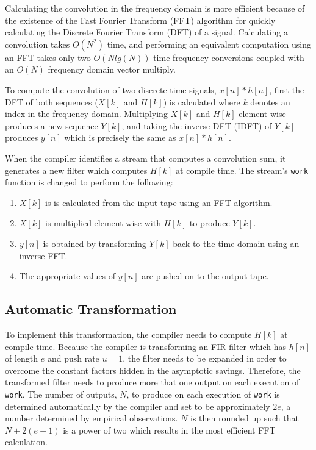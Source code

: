 Calculating the convolution in the frequency domain is more efficient
because of the existence of the Fast Fourier Transform (FFT) algorithm
for quickly calculating the Discrete Fourier Transform (DFT) of a signal.
Calculating a convolution takes $O(N^2)$ time, and performing an equivalent
computation using an FFT takes only two $O(N lg(N))$
time-frequency conversions coupled with an $O(N)$ frequency domain
vector multiply.


To compute the convolution of two discrete time signals, $x[n]*h[n]$,
first the DFT of both sequences ($X[k]$ and $H[k]$) is calculated where
$k$ denotes an index in the frequency domain.
Multiplying $X[k]$ and $H[k]$ element-wise produces a new
sequence $Y[k]$, and taking the inverse DFT (IDFT) of $Y[k]$ produces
$y[n]$ which is precisely the same as $x[n]*h[n]$.

When the compiler identifies a stream that computes a convolution sum,
it generates a new filter which computes $H[k]$ at compile time. 
The stream's {\tt work} function is changed to perform the following:
\begin{enumerate}
\item $X[k]$ is is calculated from the input tape using an FFT algorithm. 
\vspace{-6pt}
\item $X[k]$ is multiplied element-wise with $H[k]$ to produce $Y[k]$. 
\vspace{-6pt}
\item $y[n]$ is obtained by transforming $Y[k]$ back to the time domain using an inverse FFT.
\vspace{-6pt}
\item The appropriate values of $y[n]$ are pushed on to the output tape.
\end{enumerate} 

\subsection{Automatic Transformation}

To implement this transformation, the compiler needs to compute $H[k]$ at
compile time. Because the compiler is transforming an FIR filter 
which has $h[n]$ of length $e$ and push rate $u=1$, the filter needs to be 
expanded in order to overcome the constant factors hidden in the asymptotic savings.
Therefore, the transformed filter needs to produce more that one output on each
execution of {\tt work}. The number of outputs, $N$, to produce on each 
execution of {\tt work} is determined automatically by the compiler and set to be 
approximately $2e$, a number determined by empirical observations. $N$ is then rounded 
up such that $N+2(e-1)$ is a power of two which results in the most efficient 
FFT calculation.

